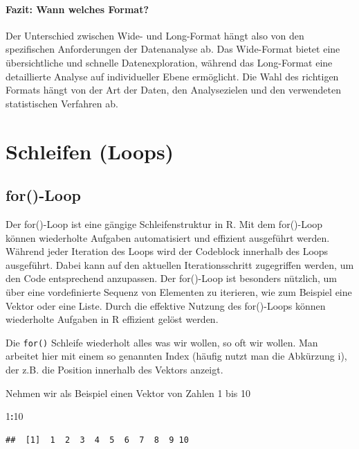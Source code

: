 \documentclass[
]{book}
\newenvironment{Shaded}{\begin{snugshade}}{\end{snugshade}}
\newcommand{\DecValTok}[1]{\textcolor[rgb]{0.00,0.00,0.81}{#1}}
\newcommand{\SpecialCharTok}[1]{\textcolor[rgb]{0.81,0.36,0.00}{\textbf{#1}}}
\begin{document}
\subsubsection{Fazit: Wann welches Format?}\label{fazit-wann-welches-format}

Der Unterschied zwischen Wide- und Long-Format hängt also von den spezifischen Anforderungen der Datenanalyse ab. Das Wide-Format bietet eine übersichtliche und schnelle Datenexploration, während das Long-Format eine detaillierte Analyse auf individueller Ebene ermöglicht. Die Wahl des richtigen Formats hängt von der Art der Daten, den Analysezielen und den verwendeten statistischen Verfahren ab.

\chapter{Schleifen (Loops)}\label{schleifen-loops}

\section{for()-Loop}\label{for-loop}

Der for()-Loop ist eine gängige Schleifenstruktur in R. Mit dem for()-Loop können wiederholte Aufgaben automatisiert und effizient ausgeführt werden.
Während jeder Iteration des Loops wird der Codeblock innerhalb des Loops ausgeführt. Dabei kann auf den aktuellen Iterationsschritt zugegriffen werden, um den Code entsprechend anzupassen. Der for()-Loop ist besonders nützlich, um über eine vordefinierte Sequenz von Elementen zu iterieren, wie zum Beispiel eine Vektor oder eine Liste. Durch die effektive Nutzung des for()-Loops können wiederholte Aufgaben in R effizient gelöst werden.

Die \texttt{for()} Schleife wiederholt alles was wir wollen, so oft wir wollen. Man arbeitet hier mit einem so genannten Index (häufig nutzt man die Abkürzung i), der z.B. die Position innerhalb des Vektors anzeigt.

Nehmen wir als Beispiel einen Vektor von Zahlen 1 bis 10

\begin{Shaded}
\begin{Highlighting}[]
\DecValTok{1}\SpecialCharTok{:}\DecValTok{10}
\end{Highlighting}
\end{Shaded}

\begin{verbatim}
##  [1]  1  2  3  4  5  6  7  8  9 10
\end{verbatim}
\end{document}
